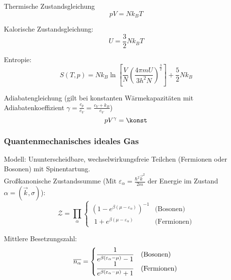 \documentclass[11pt]{article}
\numberwithin{equation}{section}
\begin{document}
        Thermische Zustandsgleichung
        \begin{equation}
          pV = N k_B T
        \end{equation}

        Kalorische Zustandsgleichung:
        \begin{equation}
          U = \frac{3}{2} N k_B T
        \end{equation}

        Entropie:
        \begin{equation}
          S(T,p) = N k_B \ln{\left[ \frac{V}{N}\left( \frac{4\pi m  U}{3 h^2 N} \right)^{\frac{3}{2}} \right]} + \frac{5}{2} N k_B
        \end{equation}

        Adiabatengleichung (gilt bei konstanten Wärmekapazitäten mit Adiabatenkoeffizient $\gamma = \frac{c_p}{c_V} = \frac{c_V + k_B}{c_V}$)
        \begin{equation}
          p V^\gamma = \konst
        \end{equation}

      \subsubsection{Quantenmechanisches ideales Gas}
        Modell: Ununterscheidbare, wechselwirkungsfreie Teilchen (Fermionen oder Bosonen) mit Spinentartung. \\

        Großkanonische Zustandssumme (Mit $\varepsilon_\alpha = \frac{\hbar^2 \vec{k}^2}{2m}$ der Energie im Zustand $\alpha=(\vec{k},\sigma)$):
        \begin{equation}
          \mathcal{Z} = \prod_{\alpha}
            \begin{cases}
              \left( 1-e^{\beta(\mu-\varepsilon_\alpha)}\right)^{-1} & \text{(Bosonen)} \\
              \phantom{\big(} 1+e^{\beta(\mu-\varepsilon_\alpha)} & \text{(Fermionen)}
            \end{cases}
        \end{equation}

        Mittlere Besetzungszahl:
        \begin{equation}
          \overline{n_\alpha} =
              \begin{cases}
                \dfrac{1}{e^{\beta(\varepsilon_\alpha-\mu)} - 1} & \text{(Bosonen)} \\
                \dfrac{1}{e^{\beta(\varepsilon_\alpha-\mu)} + 1} & \text{(Fermionen)}
              \end{cases} \\
        \end{equation}
\end{document}
